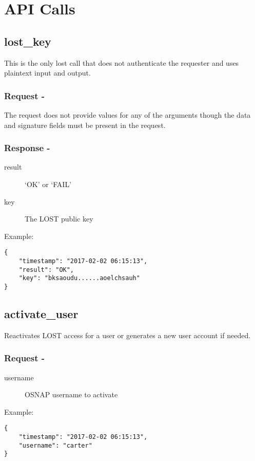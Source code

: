 \section*{API Calls}
\subsection*{lost\_key}
This is the only lost call that does not authenticate the requester and uses plaintext input and output.
\\
\subsubsection*{Request -}
The request does not provide values for any of the arguments though the data and signature fields must be present in the request.

\subsubsection*{Response -}
\begin{description}
\item[result] `OK' or `FAIL'
\item[key] The LOST public key
\end{description}

\noindent Example:
\begin{verbatim}
{
    "timestamp": "2017-02-02 06:15:13",
    "result": "OK",
    "key": "bksaoudu......aoelchsauh"
}
\end{verbatim}



\subsection*{activate\_user}
Reactivates LOST access for a user or generates a new user account if needed.
\\

\subsubsection*{Request -}
\begin{description}
\item[username] OSNAP username to activate
\end{description}

\noindent Example:
\begin{verbatim}
{
    "timestamp": "2017-02-02 06:15:13",
    "username": "carter"
}
\end{verbatim}


